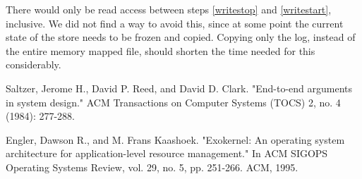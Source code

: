 \documentclass[12pt,a4paper,fleqn]{article}
\begin{document}
There would only be read access between steps \ref{writestop} and \ref{writestart}, inclusive. We did not find a way to avoid this, since at some point the current state of the store needs to be frozen and copied. Copying only the log, instead of the entire memory mapped file, should shorten the time needed for this considerably.

\begin{thebibliography}{1}

 Saltzer, Jerome H., David P. Reed, and David D. Clark. "End-to-end arguments in system design." ACM Transactions on Computer Systems (TOCS) 2, no. 4 (1984): 277-288.

 Engler, Dawson R., and M. Frans Kaashoek. "Exokernel: An operating system architecture for application-level resource management." In ACM SIGOPS Operating Systems Review, vol. 29, no. 5, pp. 251-266. ACM, 1995.

\end{thebibliography}
\end{document}
